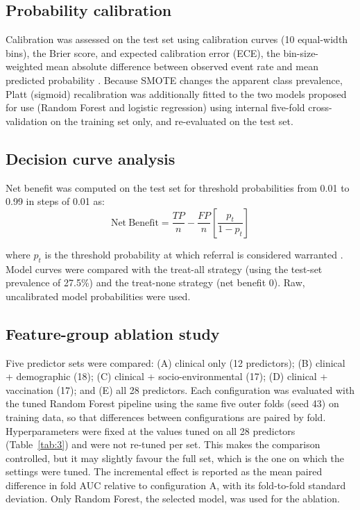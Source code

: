 \documentclass[a4paper,fleqn]{cas-dc}
\begin{document}
\subsection{Probability calibration}
\label{sec:calm}

Calibration was assessed on the test set using calibration curves (10 equal-width bins), the Brier score, and expected calibration error (ECE), the bin-size-weighted mean absolute difference between observed event rate and mean predicted probability \cite{r28}. Because SMOTE changes the apparent class prevalence, Platt (sigmoid) recalibration \cite{r29} was additionally fitted to the two models proposed for use (Random Forest and logistic regression) using internal five-fold cross-validation on the training set only, and re-evaluated on the test set.

\subsection{Decision curve analysis}
\label{sec:dcam}

Net benefit was computed on the test set for threshold probabilities from 0.01 to 0.99 in steps of 0.01 as:
\begin{equation}
\mathrm{Net\ Benefit}=\frac{TP}{n}-\frac{FP}{n}\left[\frac{p_t}{1-p_t}\right]
\label{eq:1}
\end{equation}

where $p_t$ is the threshold probability at which referral is considered warranted \cite{r27}. Model curves were compared with the treat-all strategy (using the test-set prevalence of 27.5\%) and the treat-none strategy (net benefit 0). Raw, uncalibrated model probabilities were used.

\subsection{Feature-group ablation study}

Five predictor sets were compared: (A) clinical only (12 predictors); (B) clinical + demographic (18); (C) clinical + socio-environmental (17); (D) clinical + vaccination (17); and (E) all 28 predictors. Each configuration was evaluated with the tuned Random Forest pipeline using the same five outer folds (seed 43) on training data, so that differences between configurations are paired by fold. Hyperparameters were fixed at the values tuned on all 28 predictors (Table~\ref{tab:3}) and were not re-tuned per set. This makes the comparison controlled, but it may slightly favour the full set, which is the one on which the settings were tuned. The incremental effect is reported as the mean paired difference in fold AUC relative to configuration A, with its fold-to-fold standard deviation. Only Random Forest, the selected model, was used for the ablation.
\end{document}
